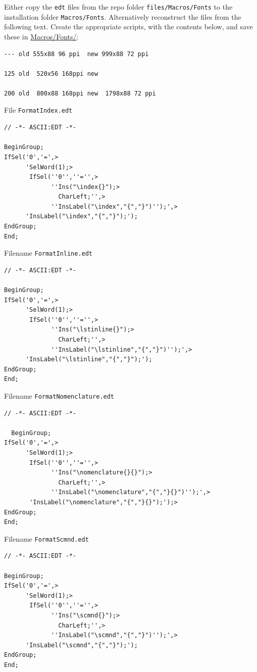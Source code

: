 Either copy the \lstinline{edt} files from the repo folder \lstinline{files/Macros/Fonts} to the installation folder
\lstinline{Macros/Fonts}. Alternatively reconstruct the files from the following text. Create the appropriate scripts, with the contents below, and save these in \url{Macros/Fonts/}:


\begin{lstlisting}
--- old 555x88 96 ppi  new 999x88 72 ppi

125 old  520x56 168ppi new

200 old  800x88 168ppi new  1798x88 72 ppi
\end{lstlisting}





File \texttt{FormatIndex.edt}
\begin{lstlisting}
// -*- ASCII:EDT -*-

BeginGroup;
IfSel('0','=',>
      'SelWord(1);>
       IfSel(''0'',''='',>
             ''Ins("\index{}");>
               CharLeft;'',>
             ''InsLabel("\index","{","}")'');',>
      'InsLabel("\index","{","}");');
EndGroup;
End;
\end{lstlisting}


Filename \texttt{FormatInline.edt}
\begin{lstlisting}
// -*- ASCII:EDT -*-

BeginGroup;
IfSel('0','=',>
      'SelWord(1);>
       IfSel(''0'',''='',>
             ''Ins("\lstinline{}");>
               CharLeft;'',>
             ''InsLabel("\lstinline","{","}")'');',>
      'InsLabel("\lstinline","{","}");');
EndGroup;
End;
\end{lstlisting}

Filename \texttt{FormatNomenclature.edt}
\begin{lstlisting}
// -*- ASCII:EDT -*-

  BeginGroup;
IfSel('0','=',>
      'SelWord(1);>
       IfSel(''0'',''='',>
             ''Ins("\nomenclature{}{}");>
               CharLeft;'',>
             ''InsLabel("\nomenclature","{","}{}")'');',>
       'InsLabel("\nomenclature","{","}{}");');>
EndGroup;
End;
\end{lstlisting}

Filename \texttt{FormatScmnd.edt}
\begin{lstlisting}
// -*- ASCII:EDT -*-

BeginGroup;
IfSel('0','=',>
      'SelWord(1);>
       IfSel(''0'',''='',>
             ''Ins("\scmnd{}");>
               CharLeft;'',>
             ''InsLabel("\scmnd","{","}")'');',>
      'InsLabel("\scmnd","{","}");');
EndGroup;
End;
\end{lstlisting}

